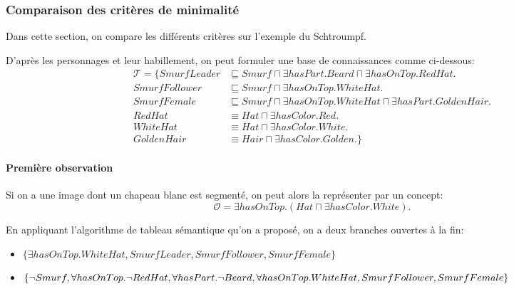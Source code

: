 \documentclass{article}
\begin{document}
\subsubsection{Comparaison des critères de minimalité}
Dans cette section, on compare les différents critères sur l'exemple du Schtroumpf.


D'après les personnages et leur habillement, on peut formuler une base de connaissances comme ci-dessous:\vspace{-0.3cm}
\begin{align*}
\mathcal{T}=\{ SmurfLeader &\sqsubseteq Smurf \sqcap \exists hasPart.Beard \sqcap \exists hasOnTop.RedHat. \\
SmurfFollower &\sqsubseteq Smurf \sqcap \exists hasOnTop.WhiteHat. \\
SmurfFemale &\sqsubseteq Smurf \sqcap \exists hasOnTop.WhiteHat \sqcap \exists hasPart.GoldenHair. \\
RedHat &\equiv Hat \sqcap \exists hasColor.Red. \\
WhiteHat &\equiv Hat \sqcap \exists hasColor.White. \\
GoldenHair &\equiv Hair \sqcap \exists hasColor.Golden.\}
\end{align*}
\paragraph*{Première observation}

Si on a une image dont un chapeau blanc est segmenté, on peut alors la représenter par un concept:\vspace{-0.1cm}
$$\mathcal{O}= \exists hasOnTop.(Hat \sqcap \exists hasColor.White).$$

En appliquant l'algorithme de tableau sémantique qu'on a proposé, on a deux branches ouvertes à la fin:
\begin{itemize}
 \item $\{ \exists hasOnTop.WhiteHat, SmurfLeader, SmurfFollower,SmurfFemale\}$
 \item $\{ \neg Smurf, \forall hasOnTop. \neg RedHat, \forall hasPart.\neg Beard, \forall hasOnTop. WhiteHat, \\ SmurfFollower,SmurfFemale\}$
\end{itemize}
\medskip
\end{document}
